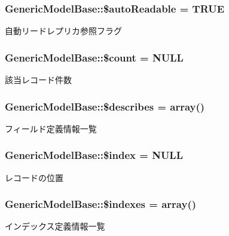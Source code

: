 \subsubsection[{\$auto\+Readable}]{\setlength{\rightskip}{0pt plus 5cm}Generic\+Model\+Base\+::\$auto\+Readable = T\+R\+U\+E}\label{class_generic_model_base_af3f05010e4e7568af3d1dce54b655d77}
自動リードレプリカ参照フラグ \hypertarget{class_generic_model_base_aade2619cff90d04f21e32310b0361031}{}
\subsubsection[{\$count}]{\setlength{\rightskip}{0pt plus 5cm}Generic\+Model\+Base\+::\$count = N\+U\+L\+L}\label{class_generic_model_base_aade2619cff90d04f21e32310b0361031}
該当レコード件数 \hypertarget{class_generic_model_base_a683813ecbc60919b3c71c2efbe0f6cc7}{}
\subsubsection[{\$describes}]{\setlength{\rightskip}{0pt plus 5cm}Generic\+Model\+Base\+::\$describes = array()}\label{class_generic_model_base_a683813ecbc60919b3c71c2efbe0f6cc7}
フィールド定義情報一覧 \hypertarget{class_generic_model_base_a1f13b9f47635cf5951e0987b61c08f32}{}
\subsubsection[{\$index}]{\setlength{\rightskip}{0pt plus 5cm}Generic\+Model\+Base\+::\$index = N\+U\+L\+L}\label{class_generic_model_base_a1f13b9f47635cf5951e0987b61c08f32}
レコードの位置 \hypertarget{class_generic_model_base_a8c0087aff6185df933386f675026dcf4}{}
\subsubsection[{\$indexes}]{\setlength{\rightskip}{0pt plus 5cm}Generic\+Model\+Base\+::\$indexes = array()}\label{class_generic_model_base_a8c0087aff6185df933386f675026dcf4}
インデックス定義情報一覧 \hypertarget{class_generic_model_base_a65d3d162749afd4b2417533e5beb95d2}{}
